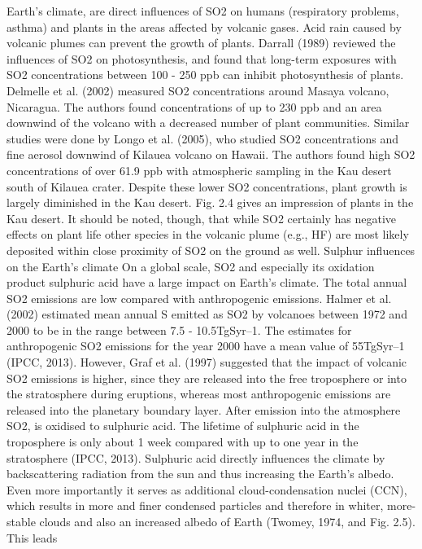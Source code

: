 \documentclass  [
  paper    = a4,
  BCOR     = 10mm,
  twoside,
  fontsize = 12pt,
  fleqn,
  toc      = bibnumbered,
  toc      = listofnumbered,
  numbers  = noendperiod,
  headings = normal,
  listof   = leveldown,
  version  = 3.03
]                                       {scrreprt}
\begin{document}
	Earth’s climate, are direct influences
	of SO2 on humans (respiratory problems,
	asthma) and plants in the areas
	affected by volcanic gases. Acid rain
	caused by volcanic plumes can prevent
	the growth of plants. Darrall (1989)
	reviewed the influences of SO2 on photosynthesis,
	and found that long-term
	exposures with SO2 concentrations between
	100 - 250 ppb can inhibit photosynthesis
	of plants. Delmelle et al.
	(2002) measured SO2 concentrations
	around Masaya volcano, Nicaragua.
	The authors found concentrations of
	up to 230 ppb and an area downwind
	of the volcano with a decreased number
	of plant communities. Similar
	studies were done by Longo et al.
	(2005), who studied SO2 concentrations
	and fine aerosol downwind of Kilauea
	volcano on Hawaii. The authors
	found high SO2 concentrations of over
	61.9 ppb with atmospheric sampling in the Kau desert south of Kilauea crater.
	Despite these lower SO2 concentrations, plant growth is largely diminished in the
	Kau desert. Fig. 2.4 gives an impression of plants in the Kau desert. It should be
	noted, though, that while SO2 certainly has negative effects on plant life other
	species in the volcanic plume (e.g., HF) are most likely deposited within close
	proximity of SO2 on the ground as well.
	Sulphur influences on the Earth’s climate
	On a global scale, SO2 and especially its oxidation product sulphuric acid have
	a large impact on Earth’s climate. The total annual SO2 emissions are low
	compared with anthropogenic emissions. Halmer et al. (2002) estimated mean
	annual S emitted as SO2 by volcanoes between 1972 and 2000 to be in the range
	between 7.5 - 10.5TgSyr–1. The estimates for anthropogenic SO2 emissions for
	the year 2000 have a mean value of 55TgSyr–1 (IPCC, 2013). However, Graf et al.
	(1997) suggested that the impact of volcanic SO2 emissions is higher, since they
	are released into the free troposphere or into the stratosphere during eruptions,
	whereas most anthropogenic emissions are released into the planetary boundary
	layer. After emission into the atmosphere SO2, is oxidised to sulphuric acid. The
	lifetime of sulphuric acid in the troposphere is only about 1 week compared with
	up to one year in the stratosphere (IPCC, 2013).
	Sulphuric acid directly influences the climate by backscattering radiation
	from the sun and thus increasing the Earth’s albedo. Even more importantly
	it serves as additional cloud-condensation nuclei (CCN), which results in more
	and finer condensed particles and therefore in whiter, more-stable clouds and
	also an increased albedo of Earth (Twomey, 1974, and Fig. 2.5). This leads
\end{document}
